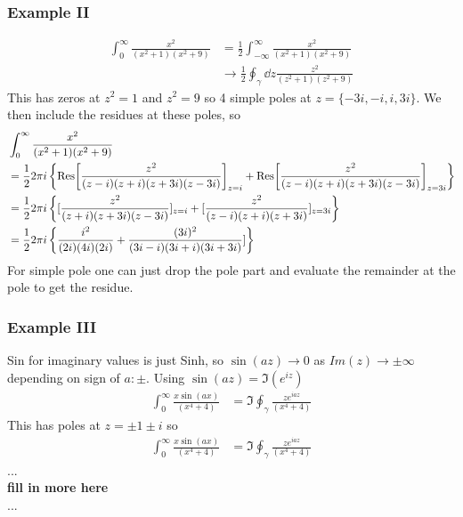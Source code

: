 \documentclass[a4paper,12pt]{article}
\begin{document}
\subsubsection{Example II}
\begin{equation}
\begin{aligned}
\int_{0}^{\infty}\frac{x^2}{(x^2+1)(x^2+9)}&=\frac{1}{2}\int_{-\infty}^{\infty}\frac{x^2}{(x^2+1)(x^2+9)}\\
&\to \frac{1}{2}\oint_\gamma \dd z \frac{z^2}{(z^2+1)(z^2+9)}
\end{aligned}
\end{equation}
This has zeros at $z^2=1$ and $z^2=9$ so 4 simple poles at $z=\{-3i,-i,i,3i\}$. We then include the residues at these poles, so
\begin{equation}
\begin{aligned}
	&\int_{0}^{\infty}\frac{x^2}{(x^2+1)(x^2+9)}\\
	&=\frac{1}{2}2\pi i \left\{
	\Res[\frac{z^2}{(z-i)(z+i)(z+3i)(z-3i)}]_{z=i}+	\Res[\frac{z^2}{(z-i)(z+i)(z+3i)(z-3i)}]_{z=3i}
	\right\}\\
	&=\frac{1}{2}2\pi i \left\{[\frac{z^2}{(z+i)(z+3i)(z-3i)}]_{z=i}+	[\frac{z^2}{(z-i)(z+i)(z+3i)}]_{z=3i}
	\right\}\\
	&=\frac{1}{2}2\pi i \left\{\frac{i^2}{(2i)(4i)(2i)}+\frac{(3i)^2}{(3i-i)(3i+i)(3i+3i)}]
	\right\}
\end{aligned}
\end{equation}
For simple pole one can just drop the pole part and evaluate the remainder at the pole to get the residue.\\
\subsubsection{Example III}
Sin for imaginary values is just Sinh, so $\sin(a z)\to 0$ as $Im(z)\to \pm\infty$ depending on sign of $a:\pm$. Using $\sin(az)=\Im(e^{iz})$
\begin{equation}
	\begin{aligned}
		\int_{0}^{\infty}\frac{x \sin(a x)}{(x^4+4)}&=\Im \oint_\gamma \frac{z e^{iaz}}{(x^4+4)}
	\end{aligned}
\end{equation}
This has poles at $z=\pm 1 \pm i$ so
\begin{equation}
	\begin{aligned}
		\int_{0}^{\infty}\frac{x \sin(a x)}{(x^4+4)}&=\Im \oint_\gamma \frac{z e^{iaz}}{(x^4+4)}
	\end{aligned}
\end{equation}
...\\
\textbf{fill in more here}\\
...\\
\end{document}

